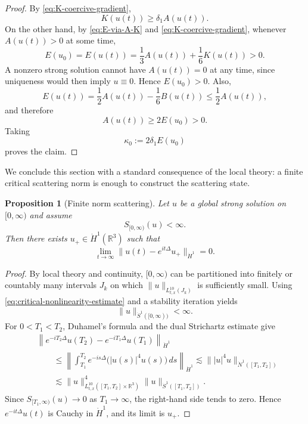 \documentclass[10pt,a4paper]{amsart}
\numberwithin{equation}{section}
\newtheorem{proposition}[theorem]{Proposition}
\newcommand{\R}{\mathbb R}
\newcommand{\Nd}{\dot N^1}
\newcommand{\Sd}{\dot S^1}
\begin{document}
\begin{proof}
By \eqref{eq:K-coercive-gradient},
\begin{equation*}
  K(u(t))\ge\delta_1A(u(t)).
\end{equation*}
On the other hand, by \eqref{eq:E-via-A-K} and \eqref{eq:K-coercive-gradient}, whenever $A(u(t))>0$ at some time,
\begin{equation*}
  E(u_0)=E(u(t))=\frac13A(u(t))+\frac16K(u(t))>0.
\end{equation*}
A nonzero strong solution cannot have $A(u(t))=0$ at any time, since uniqueness would then imply $u\equiv0$. Hence $E(u_0)>0$. Also,
\begin{equation*}
  E(u(t))=\frac12A(u(t))-\frac16B(u(t))\le\frac12A(u(t)),
\end{equation*}
and therefore
\begin{equation*}
  A(u(t))\ge2E(u_0)>0.
\end{equation*}
Taking
\begin{equation*}
  \kappa_0:=2\delta_1E(u_0)
\end{equation*}
proves the claim.
\end{proof}

We conclude this section with a standard consequence of the local theory: a finite critical scattering norm is enough to construct the scattering state.

\begin{proposition}[Finite norm scattering]\label{prop:finite-S-scattering}
Let $u$ be a global strong solution on $[0,\infty)$ and assume
\begin{equation*}
  S_{[0,\infty)}(u)<\infty.
\end{equation*}
Then there exists $u_+\in\dot H^1(\R^3)$ such that
\begin{equation*}
  \lim_{t\to\infty}\|u(t)-e^{it\Delta}u_+\|_{\dot H^1}=0.
\end{equation*}
\end{proposition}

\begin{proof}
By local theory and continuity, $[0,\infty)$ can be partitioned into finitely or countably many intervals $J_k$ on which $\|u\|_{L_{t,x}^{10}(J_k)}$ is sufficiently small. Using \eqref{eq:critical-nonlinearity-estimate} and a stability iteration yields
\begin{equation*}
  \|u\|_{\Sd([0,\infty))}<\infty.
\end{equation*}
For $0<T_1<T_2$, Duhamel's formula and the dual Strichartz estimate give
\begin{align*}
  &\left\|e^{-iT_2\Delta}u(T_2)-e^{-iT_1\Delta}u(T_1)\right\|_{\dot H^1}\\
  &\qquad\le
  \left\|\int_{T_1}^{T_2}e^{-is\Delta}\bigl(|u(s)|^4u(s)\bigr)\,ds\right\|_{\dot H^1}
  \lesssim \||u|^4u\|_{\Nd([T_1,T_2])}\\
  &\qquad\lesssim
  \|u\|_{L_{t,x}^{10}([T_1,T_2]\times\R^3)}^4
  \|u\|_{\Sd([T_1,T_2])}.
\end{align*}
Since $S_{[T_1,\infty)}(u)\to0$ as $T_1\to\infty$, the right-hand side tends to zero. Hence $e^{-it\Delta}u(t)$ is Cauchy in $\dot H^1$, and its limit is $u_+$.
\end{proof}
\end{document}
